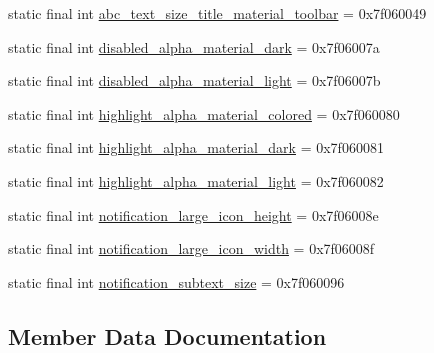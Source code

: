 \begin{DoxyCompactItemize}
static final int \mbox{\hyperlink{classcom_1_1google_1_1android_1_1gms_1_1R_1_1dimen_ab4163f67d1eda9b0e6b1382af610614c}{abc\+\_\+text\+\_\+size\+\_\+title\+\_\+material\+\_\+toolbar}} = 0x7f060049
\item 
static final int \mbox{\hyperlink{classcom_1_1google_1_1android_1_1gms_1_1R_1_1dimen_afe5cabf5bd541f9964326518f4fbd532}{disabled\+\_\+alpha\+\_\+material\+\_\+dark}} = 0x7f06007a
\item 
static final int \mbox{\hyperlink{classcom_1_1google_1_1android_1_1gms_1_1R_1_1dimen_abdd09a9097f136fa57e846ba2f809fe5}{disabled\+\_\+alpha\+\_\+material\+\_\+light}} = 0x7f06007b
\item 
static final int \mbox{\hyperlink{classcom_1_1google_1_1android_1_1gms_1_1R_1_1dimen_a2409a3f2e7f8903284aab3b7a1e4e7f7}{highlight\+\_\+alpha\+\_\+material\+\_\+colored}} = 0x7f060080
\item 
static final int \mbox{\hyperlink{classcom_1_1google_1_1android_1_1gms_1_1R_1_1dimen_a53e63f33189c8b20f52b23a60da648fa}{highlight\+\_\+alpha\+\_\+material\+\_\+dark}} = 0x7f060081
\item 
static final int \mbox{\hyperlink{classcom_1_1google_1_1android_1_1gms_1_1R_1_1dimen_ad475487ed5f4aa83e2eb2e39b670affd}{highlight\+\_\+alpha\+\_\+material\+\_\+light}} = 0x7f060082
\item 
static final int \mbox{\hyperlink{classcom_1_1google_1_1android_1_1gms_1_1R_1_1dimen_a9c94fb0d74958b02d1fc57ccf1754b65}{notification\+\_\+large\+\_\+icon\+\_\+height}} = 0x7f06008e
\item 
static final int \mbox{\hyperlink{classcom_1_1google_1_1android_1_1gms_1_1R_1_1dimen_a858c555942ff2ea6de6463badf5ab561}{notification\+\_\+large\+\_\+icon\+\_\+width}} = 0x7f06008f
\item 
static final int \mbox{\hyperlink{classcom_1_1google_1_1android_1_1gms_1_1R_1_1dimen_a0b02fe66671678dd7d4c8907157af91e}{notification\+\_\+subtext\+\_\+size}} = 0x7f060096
\end{DoxyCompactItemize}


\subsection{Member Data Documentation}
\mbox{\label{classcom_1_1google_1_1android_1_1gms_1_1R_1_1dimen_a25af3e8fc61447421921ad5d3e792d45}} 
